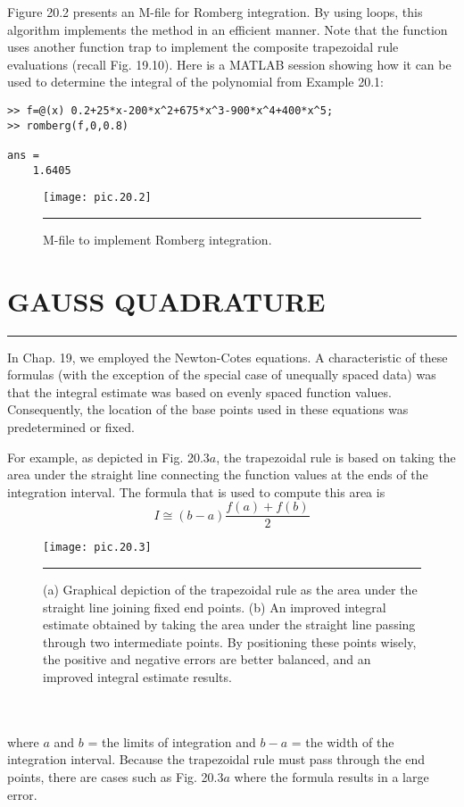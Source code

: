 \documentclass[../main.tex]{subfiles}
\begin{document}
Figure 20.2 presents an M-file for Romberg integration. By using loops, this algorithm
implements the method in an efficient manner. Note that the function uses another function
trap to implement the composite trapezoidal rule evaluations (recall Fig. 19.10). Here is
a MATLAB session showing how it can be used to determine the integral of the polynomial
from Example 20.1:

\begin{verbatim}
>> f=@(x) 0.2+25*x-200*x^2+675*x^3-900*x^4+400*x^5;
>> romberg(f,0,0.8)

ans =
    1.6405
\end{verbatim}

\begin{figure}[hbt!]
	\centering
	\texttt{[image: pic.20.2]}
	\caption{\textsf{M-file to implement Romberg integration.}} \hrule
	\label{pic.20.2}
\end{figure}

\vspace{0,3in}
\section{GAUSS QUADRATURE}
\vspace{0,1in}
\hrule
\vspace{0,1in}
In Chap. 19, we employed the Newton-Cotes equations. A characteristic of these formulas
(with the exception of the special case of unequally spaced data) was that the integral estimate was based on evenly spaced function values. Consequently, the location of the base
points used in these equations was predetermined or fixed.

For example, as depicted in Fig. 20.3$a$, the trapezoidal rule is based on taking the area
under the straight line connecting the function values at the ends of the integration interval.
The formula that is used to compute this area is
\begin{equation}
	\tag{20.10}
	I\cong (b-a)\dfrac{f(a)+f(b)}{2}
\end{equation}
\pagebreak
\begin{figure}[hbt!]
	\centering
	\texttt{[image: pic.20.3]}
	\caption{\textsf{(a) Graphical depiction of the trapezoidal rule as the area under the straight line joining fixed
end points. (b) An improved integral estimate obtained by taking the area under the straight line
passing through two intermediate points. By positioning these points wisely, the positive and 
negative errors are better balanced, and an improved integral estimate results.}} \hrule
	\label{pic.20.3}
\end{figure}\\
\vspace{0.1in}\\
where $a$ and $b$ = the limits of integration and $b − a$ = the width of the integration interval.
Because the trapezoidal rule must pass through the end points, there are cases such as
Fig. 20.3$a$ where the formula results in a large error.
\end{document}
